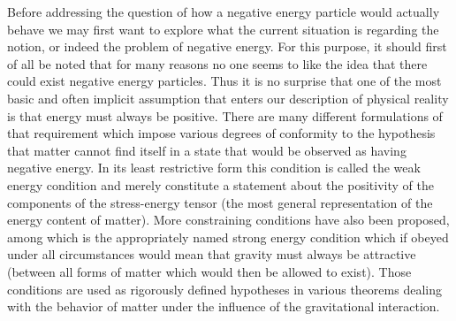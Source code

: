 \documentclass[notitlepage,12pt]{report}
\begin{document}
Before addressing the question of how a negative energy particle would actually behave we may first want to explore what the current situation is regarding the notion, or indeed the problem of negative energy. For this purpose, it should first of all be noted that for many reasons no one seems to like the idea that there could exist negative energy particles. Thus it is no surprise that one of the most basic and often implicit assumption that enters our description of physical reality is that energy must always be positive. There are many different formulations of that requirement which impose various degrees of conformity to the hypothesis that matter cannot find itself in a state that would be observed as having negative energy. In its least restrictive form this condition is called the weak energy condition and merely constitute a statement about the positivity of the components of the stress-energy tensor (the most general representation of the energy content of matter). More constraining conditions have also been proposed, among which is the appropriately named strong energy condition which if obeyed under all circumstances would mean that gravity must always be attractive (between all forms of matter which would then be allowed to exist). Those conditions are used as rigorously defined hypotheses in various theorems dealing with the behavior of matter under the influence of the gravitational interaction.
\end{document}

